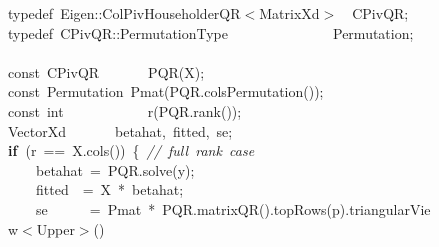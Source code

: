 \documentclass[shortnames,article]{jss}
\newcommand{\hlstd}[1]{\textcolor[rgb]{0,0,0}{#1}}
\newcommand{\hlopt}[1]{\textcolor[rgb]{0,0,0}{#1}}
\newcommand{\hlslc}[1]{\textcolor[rgb]{0.67,0.13,0.13}{\it{#1}}}
\newcommand{\hlkwa}[1]{\textcolor[rgb]{0.61,0.13,0.93}{\bf{#1}}}
\newcommand{\hlkwb}[1]{\textcolor[rgb]{0.13,0.54,0.13}{#1}}
\newcommand{\hlkwc}[1]{\textcolor[rgb]{0,0,1}{#1}}
\newcommand{\hlkwd}[1]{\textcolor[rgb]{0,0,0}{#1}}
\begin{document}
\begin{figure}[htb]
    \noindent
    \ttfamily
    \hlstd{}\hlkwc{typedef\ }\hlstd{Eigen}\hlopt{::}\hlstd{ColPivHouseholderQR}\hlopt{$<$}\hlstd{MatrixXd}\hlopt{$>$}\hlstd{\ \ }\hlopt{}\hlstd{CPivQR}\hlopt{;}\hspace*{\fill}\\
    \hlstd{}\hlkwc{typedef\ }\hlstd{CPivQR}\hlopt{::}\hlstd{PermutationType}\hlstd{\ \ \ \ \ \ \ \ \ \ \ \ \ \ \ }\hlstd{Permutation}\hlopt{;}\hspace*{\fill}\\
    \hlstd{}\hspace*{\fill}\\
    \hlkwb{const\ }\hlstd{CPivQR}\hlstd{\ \ \ \ \ \ \ }\hlstd{}\hlkwd{PQR}\hlstd{}\hlopt{(}\hlstd{X}\hlopt{);}\hspace*{\fill}\\
    \hlstd{}\hlkwb{const\ }\hlstd{Permutation\ }\hlkwd{Pmat}\hlstd{}\hlopt{(}\hlstd{PQR}\hlopt{.}\hlstd{}\hlkwd{colsPermutation}\hlstd{}\hlopt{());}\hspace*{\fill}\\
    \hlstd{}\hlkwb{const\ int}\hlstd{\ \ \ \ \ \ \ \ \ \ \ \ }\hlkwb{}\hlstd{}\hlkwd{r}\hlstd{}\hlopt{(}\hlstd{PQR}\hlopt{.}\hlstd{}\hlkwd{rank}\hlstd{}\hlopt{());}\hspace*{\fill}\\
    \hlstd{VectorXd}\hlstd{\ \ \ \ \ \ \ }\hlstd{betahat}\hlopt{,\ }\hlstd{fitted}\hlopt{,\ }\hlstd{se}\hlopt{;}\hspace*{\fill}\\
    \hlstd{}\hlkwa{if\ }\hlstd{}\hlopt{(}\hlstd{r\ }\hlopt{==\ }\hlstd{X}\hlopt{.}\hlstd{}\hlkwd{cols}\hlstd{}\hlopt{())\ \{\ }\hlstd{}\hlslc{//\ full\ rank\ case}\hspace*{\fill}\\
    \hlstd{}\hlstd{\ \ \ \ }\hlstd{betahat\ }\hlopt{=\ }\hlstd{PQR}\hlopt{.}\hlstd{}\hlkwd{solve}\hlstd{}\hlopt{(}\hlstd{y}\hlopt{);}\hspace*{\fill}\\
    \hlstd{}\hlstd{\ \ \ \ }\hlstd{fitted}\hlstd{\ \ }\hlstd{}\hlopt{=\ }\hlstd{X\ }\hlopt{{*}\ }\hlstd{betahat}\hlopt{;}\hspace*{\fill}\\
    \hlstd{}\hlstd{\ \ \ \ }\hlstd{se}\hlstd{\ \ \ \ \ \ }\hlstd{}\hlopt{=\ }\hlstd{Pmat\ }\hlopt{{*}\ }\hlstd{PQR}\hlopt{.}\hlstd{}\hlkwd{matrixQR}\hlstd{}\hlopt{().}\hlstd{}\hlkwd{topRows}\hlstd{}\hlopt{(}\hlstd{p}\hlopt{).}\hlstd{triangularView}\hlopt{$<$}\hlstd{Upper}\hlopt{$>$()}\hspace*{\fill}\\

\end{figure}
\end{document}
